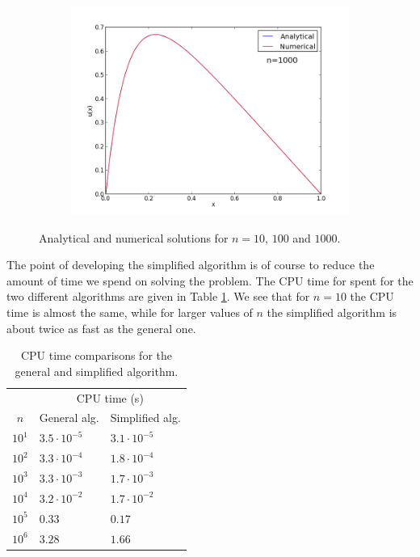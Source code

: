 \documentclass[12pt, a4paper]{article}
\begin{document}
\begin{figure}[ht!]
\begin{subfigure}[b]{0.495\textwidth}
  \end{subfigure}
  \begin{subfigure}[b]{0.495\textwidth}
        \includegraphics[width=\textwidth]{../Program/plot_n_1000.png}
  \end{subfigure}
  \caption{Analytical and numerical solutions for $n=10$, $100$ and $1000$.} 
  \label{plots}
\end{figure}

The point of developing the simplified algorithm is of course to reduce the amount of time we spend on 
solving the problem. The CPU time for spent for the two different algorithms are given in Table  
\ref{CPU}. We see that for $n=10$ the CPU time is almost the same, while for larger values of $n$ the 
simplified algorithm is about twice as fast as the general one. 

\begin{table}[ht!]
\begin{center}
\begin{tabular}{c|l|l}
 & \multicolumn{2}{c}{CPU time (s)}  \\
$n$ & General alg. & Simplified alg. \\ \hline 
$10^1$ & $3.5\cdot10^{-5}$ & $3.1\cdot10^{-5}$  \\
$10^2$ & $3.3\cdot10^{-4}$ & $1.8\cdot10^{-4}$\\
$10^3$ & $3.3\cdot10^{-3}$ & $1.7\cdot10^{-3}$ \\
$10^4$ & $3.2\cdot10^{-2}$ & $1.7\cdot10^{-2}$\\
$10^5$ & $0.33$ & $0.17$ \\
$10^6$ & $3.28$ & $1.66$ \\ 
\end{tabular}
\caption{CPU time comparisons for the general and simplified algorithm.}
\label{CPU}
\end{center}
\end{table}
\end{document}
